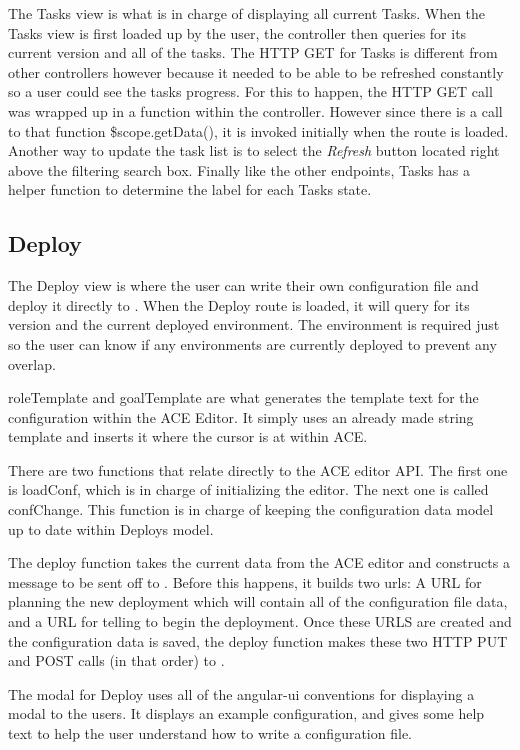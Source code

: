 The Tasks view is what is in charge of displaying all current \ancor{} Tasks. When the Tasks view is first loaded up by the user, the controller then queries \ancor{} for its current version and all of the tasks. The HTTP GET for Tasks is different from other controllers however because it needed to be able to be refreshed constantly so a user could see the tasks progress. For this to happen, the HTTP GET call was wrapped up in a function within the controller. However since there is a call to that function \$scope.getData(), it is invoked initially when the route is loaded. Another way to update the task list is to select the \emph{Refresh} button located right above the filtering search box. Finally like the other endpoints, Tasks has a helper function to determine the label for each Tasks state.

\subsection{Deploy}

The Deploy view is where the user can write their own configuration file and deploy it directly to \ancor{}. When the Deploy route is loaded, it will query \ancor{} for its version and the current deployed environment. The environment is required just so the user can know if any environments are currently deployed to prevent any overlap.

roleTemplate and goalTemplate are what generates the template text for the configuration within the ACE Editor. It simply uses an already made string template and inserts it where the cursor is at within ACE.

There are two functions that relate directly to the ACE editor API. The first one is loadConf, which is in charge of initializing the editor. The next one is called confChange. This function is in charge of keeping the configuration data model up to date within Deploys model.

The deploy function takes the current data from the ACE editor and constructs a message to be sent off to \ancor{}. Before this happens, it builds two urls: A URL for planning the new deployment which will contain all of the configuration file data, and a URL for telling \ancor{} to begin the deployment. Once these URLS are created and the configuration data is saved, the deploy function makes these two HTTP PUT and POST calls (in that order) to \ancor{}.

The modal for Deploy uses all of the angular-ui conventions for displaying a modal to the users. It displays an example configuration, and gives some help text to help the user understand how to write a configuration file.
